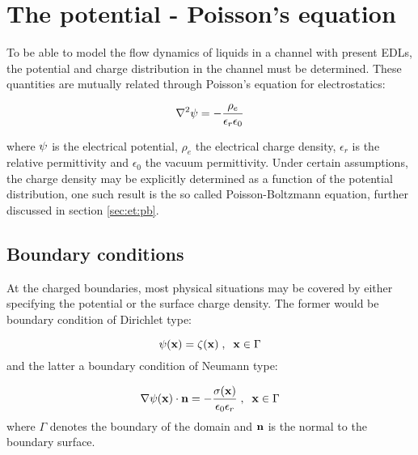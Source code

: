 \section{The potential - Poisson's equation}
To be able to model the flow dynamics of liquids in a channel with
present EDLs, the potential and charge distribution
in the channel must be determined. These quantities are mutually
related through Poisson's equation for electrostatics:

\begin{equation}\label{eq:pb}
\nabla^2\mathrm{\psi} = -\frac{\rho_e}{\epsilon_r \epsilon_0}
\end{equation}

where $\mathrm{\psi}$ is the electrical potential, $\rho_e$ the electrical
charge density, $\epsilon_r$ is the relative permittivity and
$\epsilon_0$ the vacuum permittivity. Under certain assumptions, the
charge density may be explicitly determined as a function of the
potential distribution, one such result is the so called
Poisson-Boltzmann equation, further discussed in section \ref{sec:et:pb}.

\subsection{Boundary conditions}
At the charged boundaries, most physical situations may be covered by
either specifying the potential or the surface charge density. The
former would be boundary condition of Dirichlet type:

\begin{equation}
\mathrm{\psi}(\mathbf{x}) = \zeta(\mathbf{x})\;,\;\; \mathbf{x} \in \Gamma
\end{equation}
and the latter a boundary condition of Neumann type:

\begin{equation}
\nabla\mathrm{\psi}(\mathbf{x}) \cdot \mathbf{n} =
-\frac{\sigma(\mathbf{x})}{\epsilon_0\epsilon_r}\;,\;\; \mathbf{x} \in \Gamma
\end{equation}
where $\Gamma$ denotes the boundary of the domain and $\mathbf{n}$ is the
normal to the boundary surface.\- \cite{hlushkou}
